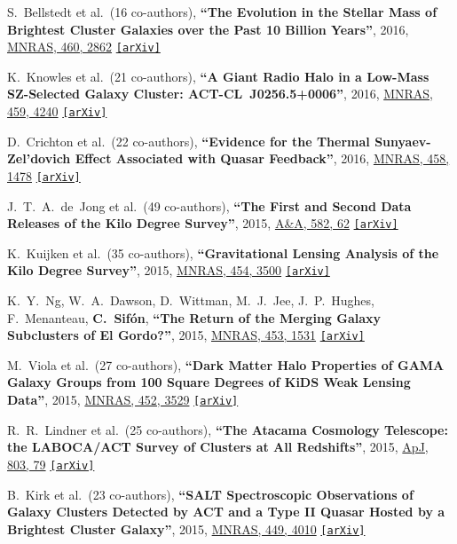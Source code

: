 \documentclass{article}
\def\aap{A\&A}
\def\apj{ApJ}
\def\mnras{MNRAS}
\newcommand{\myself}{\textbf{\color{red} C.~Sif\'on}}
\newcommand{\etal}[1]{et al.\ (#1 co-authors),}
\newcommand{\paper}[1]{\textbf{``#1''}}
\newcommand{\arxiv}[1]
    {\href{https://arxiv.org/abs/#1}{\texttt{\color{magenta}[arXiv]}}}
\begin{document}
\begin{etaremune}
\item
S.~Bellstedt \etal{16}
\paper{The Evolution in the Stellar Mass of Brightest Cluster Galaxies over the Past 10 Billion Years},
2016, \href{http://adsabs.harvard.edu/abs/2016MNRAS.460.2862B}{\mnras, 460, 2862}
\arxiv{1605.02736}

\item
K.~Knowles \etal{21}
\paper{A Giant Radio Halo in a Low-Mass SZ-Selected Galaxy Cluster: ACT-CL~J0256.5+0006},
2016, \href{http://adsabs.harvard.edu/abs/2016MNRAS.459.4240K}{\mnras, 459, 4240}
\arxiv{1506.01547}

\item
D.~Crichton \etal{22}
\paper{Evidence for the Thermal Sunyaev-Zel'dovich Effect Associated with Quasar Feedback},
2016, \href{http://adsabs.harvard.edu/abs/2016MNRAS.458.1478C}{\mnras, 458, 1478}
\arxiv{1510.05656}

\item
J.~T.~A.~de~Jong \etal{49}
\paper{The First and Second Data Releases of the Kilo Degree Survey},
2015, \href{http://adsabs.harvard.edu/abs/2015A&A...582A..62D}{\aap, 582, 62}
\arxiv{1507.00742}

\item
K.~Kuijken \etal{35}
\paper{Gravitational Lensing Analysis of the Kilo Degree Survey},
2015, \href{http://adsabs.harvard.edu/abs/2015MNRAS.454.3500K}{\mnras, 454, 3500}
\arxiv{1507.00738}

\item
K.~Y.~Ng, W.~A.~Dawson, D.~Wittman, M.~J.~Jee, J.~P.~Hughes, F.~Menanteau, \myself,
\paper{The Return of the Merging Galaxy Subclusters of El Gordo?},
2015, \href{http://adsabs.harvard.edu/abs/2015MNRAS.453.1531N}{\mnras, 453, 1531}
\arxiv{1412.1826}

\item
M.~Viola \etal{27}
\paper{Dark Matter Halo Properties of GAMA Galaxy Groups from 100 Square Degrees of KiDS Weak Lensing Data},
2015, \href{http://adsabs.harvard.edu/abs/2015MNRAS.452.3528V}{\mnras, 452, 3529}
\arxiv{1507.00735}

\item
R.~R.~Lindner \etal{25}
\paper{The Atacama Cosmology Telescope: the LABOCA/ACT Survey of Clusters at All Redshifts},
2015, \href{http://adsabs.harvard.edu/abs/2015ApJ...803...79L}{\apj, 803, 79}
\arxiv{1411.7998}

\item
B.~Kirk \etal{23}
\paper{SALT Spectroscopic Observations of Galaxy Clusters Detected by ACT and a Type II Quasar Hosted by a Brightest Cluster Galaxy},
2015, \href{http://adsabs.harvard.edu/abs/2015MNRAS.449.4010K}{\mnras, 449, 4010}
\arxiv{1410.7887}


\end{etaremune}
\end{document}
